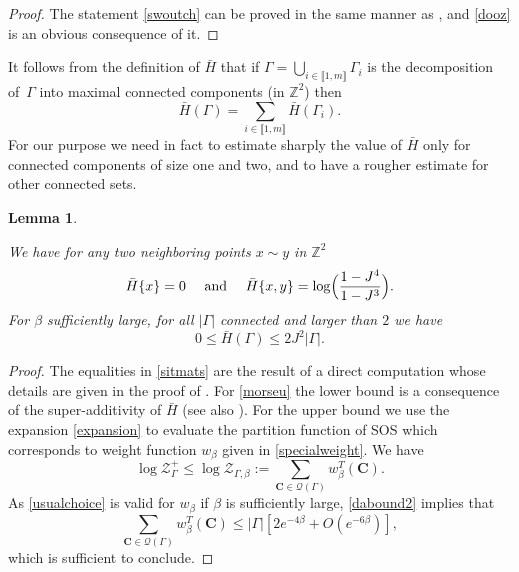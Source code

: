 \documentclass[10pt]{amsart}
\let\mathcal\mathscr
\numberwithin{equation}{section}
\theoremstyle{plain}
\newtheorem{lemma}[theorem]{Lemma}
\theoremstyle{definition}
\newcommand{\lint}{\llbracket}
\newcommand{\rint}{\rrbracket}
\newcommand{\cQ}{{\ensuremath{\mathcal Q}} }
\newcommand{\cZ}{{\ensuremath{\mathcal Z}} }
\newcommand{\bC}{{\ensuremath{\mathbf C}} }
\newcommand{\bbZ}{{\ensuremath{\mathbb Z}} }
\newcommand{\gb}{\beta}
\newcommand{\gG}{\Gamma}
\begin{document}
\begin{proof}
The statement \eqref{swoutch} can be proved in the same manner as \cite[Lem.\,3.1 \& Lem.\,3.2]{cf:part1}, and \eqref{dooz} is an obvious consequence of it.
\end{proof}

It follows from the definition of $\bar H$ that if
$\gG=\bigcup_{i\in \lint 1, m\rint} \gG_i$ is the decomposition of~$\gG$ into maximal connected components (in $\bbZ^2$) then
\begin{equation}\label{maxdecomp}
\bar H(\gG)=\sum_{i\in \lint 1, m\rint} \bar H(\gG_i).
\end{equation}
For our purpose we need in fact to estimate sharply the value of $\bar H$ only for connected components of size one and two,
and to have a rougher estimate for other connected sets.

\begin{lemma}\label{zoomats}

We have for any two neighboring points $x\sim y$ in $\bbZ^2$
\begin{equation}\label{sitmats}
\bar H\{x\}=0 \quad \text{ and } \quad \bar H\{x,y\}=\log \Bigl(\frac{1-J^4}{1-J^3}\Bigr).
\end{equation}
For $\gb$ sufficiently large,
for all $|\gG|$ connected and larger than $2$ we have
\begin{equation}\label{morseu}
0\le \bar H(\gG)\le 2J^2|\gG|.
\end{equation}
\end{lemma}

\begin{proof}
The equalities in \eqref{sitmats} are the result of a direct computation whose details are given in the proof of \cite[Lem.\,3.2]{cf:part1}.
For \eqref{morseu} the lower bound is a consequence of the super-additivity of $\bar H$ (see also \cite[Lem.\,3.2]{cf:part1}). For the upper bound we use the expansion \eqref{expansion} to evaluate the partition function of SOS which corresponds to weight function $w_{\gb}$ given in \eqref{specialweight}.
We have
\begin{equation*}
\log \cZ^+_{\gG}\le \log \cZ_{\gG,\gb}:=\sum_{\bC\in \cQ(\gG)} w_{\gb}^T(\bC).
\end{equation*}
As \eqref{usualchoice} is valid for $w_{\gb}$ if $\gb$ is sufficiently large, \eqref{dabound2} implies that
\begin{equation}\label{treck}
\sum_{\bC\in \cQ(\gG)} w_{\gb}^T(\bC)\le |\gG|\left[ 2e^{-4\gb}+O(e^{-6\gb})\right],
\end{equation}
which is sufficient to conclude.
\end{proof}
\end{document}
